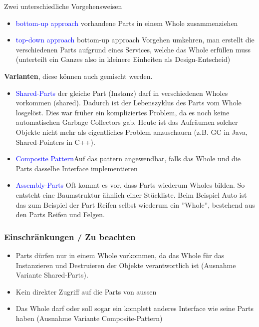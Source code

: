 Zwei unterschiedliche Vorgehensweisen

\begin{itemize}
    \item \textcolor{blue}{bottom-up approach} vorhandene Parts in einem Whole zusammenziehen
    \item \textcolor{blue}{top-down approach} bottom-up approach Vorgehen umkehren, man erstellt die verschiedenen Parts aufgrund eines Services, welche das Whole erfüllen muss (unterteilt ein Ganzes also in kleinere Einheiten als Design-Entscheid)
\end{itemize}
\vspace{10pt}
\textbf{Varianten}, diese können auch gemischt werden.

\begin{itemize}
    \item \textcolor{blue}{Shared-Parts} der gleiche Part (Instanz) darf in verschiedenen Wholes vorkommen (shared). Dadurch ist der Lebenszyklus des Parts vom Whole losgelöst. Dies war früher ein kompliziertes Problem, da es noch keine automatischen Garbage Collectors gab. Heute ist das Aufräumen solcher Objekte nicht mehr als eigentliches Problem anzuschauen (z.B. GC in Java, Shared-Pointers in C++).
    \item \textcolor{blue}{Composite Pattern}Auf das pattern angewendbar, falls das Whole und die Parts dasselbe Interface implementieren
    \item \textcolor{blue}{Assembly-Parts} Oft kommt es vor, dass Parts wiederum Wholes bilden. So entsteht eine Baumstruktur ähnlich einer Stückliste. Beim Beispiel Auto ist das zum Beispiel der Part Reifen selbst wiederum ein ''Whole'', bestehend aus den Parts Reifen und Felgen.
\end{itemize}

\subsubsection{Einschränkungen / Zu beachten}

\begin{itemize}
    \item Parts dürfen nur in einem Whole vorkommen, da das Whole für das Instanzieren und Destruieren der Objekte verantwortlich ist (Ausnahme Variante Shared-Parts).
    \item Kein direkter Zugriff auf die Parts von aussen
    \item Das Whole darf oder soll sogar ein komplett anderes Interface wie seine Parts haben (Ausnahme Variante Composite-Pattern)
\end{itemize}

